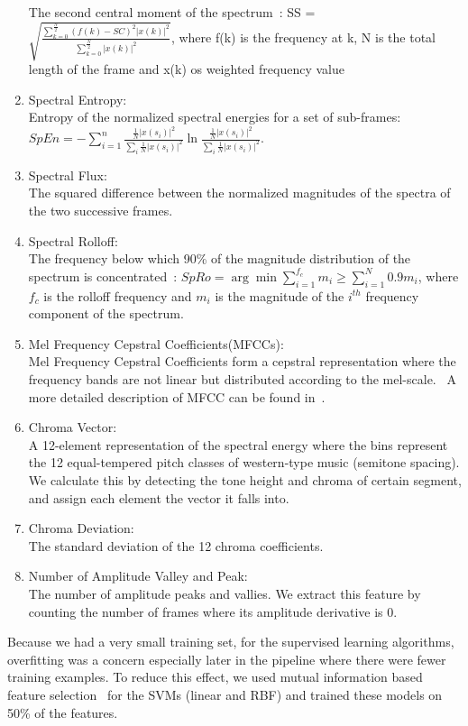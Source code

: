 \begin{enumerate}
	The second central moment of the spectrum~\cite{b3}:  SS = $\sqrt{\frac{\sum_{k = 0}^{\frac{N}{2}} (f(k)-SC)^2 |x(k)|^2}{\sum_{k = 0}^{\frac{N}{2}} |x(k)|^2 }}$, where f(k) is the frequency at k, N is the total length of the frame and x(k) os weighted frequency value \\
	\item Spectral Entropy:\\
	Entropy of the normalized spectral energies for a set of sub-frames\cite{b3}: $SpEn = -\sum_{i = 1}^{n} \frac{\frac{1}{N} |x(s_i)|^2}{\sum_{i}^{}\frac{1}{N} |x(s_i)|^2} \ln\frac{\frac{1}{N} |x(s_i)|^2}{\sum_{i}^{}\frac{1}{N} |x(s_i)|^2}$.
	\item Spectral Flux:\\
	The squared difference between the normalized magnitudes of the spectra of the two successive frames.~\cite{b3} 
	\item Spectral Rolloff:\\
	The frequency below which 90\% of the magnitude distribution of the spectrum is concentrated~\cite{b3}: $SpRo = \arg \min \sum_{i = 1}^{f_c} m_i \geq \sum_{i = 1}^{N}0.9 m_i$, where $f_c$ is the rolloff frequency and $m_i$ is the magnitude of the $i^{th}$ frequency component of the spectrum. 
	\item Mel Frequency Cepstral Coefficients(MFCCs):\\
	Mel Frequency Cepstral Coefficients form a cepstral representation where the frequency bands are not linear but distributed according to the mel-scale.~\cite{b4} A more detailed description of MFCC can be found in~\cite{b9}.
	\item Chroma Vector:\\
	A 12-element representation of the spectral energy where the bins represent the 12 equal-tempered pitch classes of western-type music (semitone spacing).\cite{b5} We calculate this by detecting the tone height and chroma of certain segment, and assign each element the vector it falls into.
	\item Chroma Deviation:\\
	The standard deviation of the 12 chroma coefficients.~\cite{b5}
	\item Number of Amplitude Valley and Peak:\\
	The number of amplitude peaks and vallies. We extract this feature by counting the number of frames where its amplitude derivative is 0. %
\end{enumerate}
\indent Because we had a very small training set, for the supervised learning algorithms, overfitting was a concern especially later in the pipeline where there were fewer training examples. To reduce this effect, we used mutual information based feature selection~\cite{b25} for the SVMs (linear and RBF) and trained these models on 50\% of the features.

